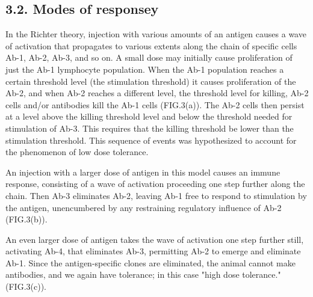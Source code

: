 \documentclass[Proceedings]{ascelike}
\begin{document}
\subsection{3.2. Modes of responsey}
In the Richter theory, injection with various amounts of an antigen causes a wave of activation that propagates to various extents along the chain of specific cells Ab-1, Ab-2, Ab-3, and so on. A small dose may initially cause proliferation of just the Ab-1 lymphocyte population. When the Ab-1 population reaches a certain threshold level (the stimulation threshold) it causes proliferation of the Ab-2, and when Ab-2 reaches a different level, the threshold level for killing, Ab-2 cells and/or antibodies kill the Ab-1 cells (FIG.3(a)). The Ab-2 cells then persist at a level above the killing threshold level and below the threshold needed for stimulation of Ab-3. This requires that the killing threshold be lower than the stimulation threshold. This sequence of events was hypothesized to account for the phenomenon of low dose tolerance.
\par
An injection with a larger dose of antigen in this model causes an immune response, consisting of a wave of activation proceeding one step further along the chain. Then Ab-3 eliminates Ab-2, leaving Ab-1 free to respond to stimulation by the antigen, unencumbered by any restraining regulatory influence of Ab-2 (FIG.3(b)).
\par
An even larger dose of antigen takes the wave of activation one step further still, activating Ab-4, that eliminates Ab-3, permitting Ab-2 to emerge and eliminate Ab-1. Since the antigen-specific clones are eliminated, the animal cannot make antibodies, and we again have tolerance; in this case "high dose tolerance." (FIG.3(c)).
\end{document}
